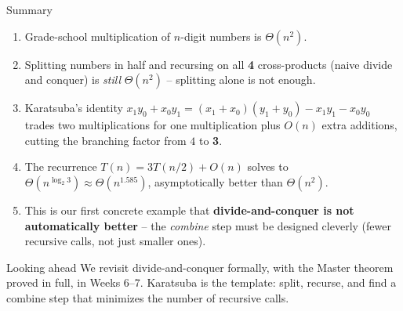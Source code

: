 \documentclass[11pt,aspectratio=169]{beamer}
\begin{document}
\begin{frame}{Summary}
  \begin{enumerate}
    \item Grade-school multiplication of $n$-digit numbers is $\Theta(n^2)$.
    \item Splitting numbers in half and recursing on all \textbf{4} cross-products
    (naive divide and conquer) is \emph{still} $\Theta(n^2)$ -- splitting alone is not
    enough.
    \item Karatsuba's identity
    $x_1y_0 + x_0y_1 = (x_1{+}x_0)(y_1{+}y_0) - x_1y_1 - x_0y_0$
    trades two multiplications for one multiplication plus $O(n)$ extra additions, cutting
    the branching factor from $4$ to \textbf{3}.
    \item The recurrence $T(n) = 3T(n/2) + O(n)$ solves to
    $\Theta(n^{\log_2 3}) \approx \Theta(n^{1.585})$, asymptotically better than
    $\Theta(n^2)$.
    \item This is our first concrete example that \textbf{divide-and-conquer is not
    automatically better} -- the \emph{combine} step must be designed cleverly (fewer
    recursive calls, not just smaller ones).
  \end{enumerate}
  \vspace{0.5em}
  \begin{alertblock}{Looking ahead}
    We revisit divide-and-conquer formally, with the Master theorem proved in full, in
    Weeks 6--7. Karatsuba is the template: split, recurse, and find a combine step that
    minimizes the number of recursive calls.
  \end{alertblock}
\end{frame}
\end{document}

